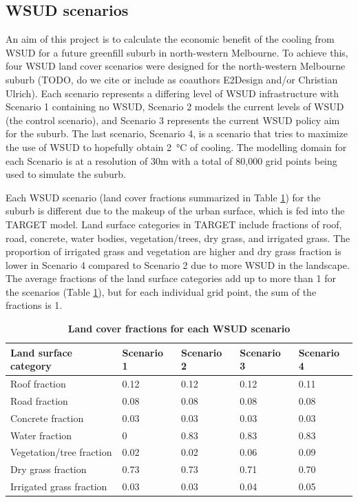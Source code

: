 \documentclass[final,3p,times,authoryear]{elsarticle}
\begin{document}
\subsection{WSUD scenarios}\label{sec:methods_wsudscenarios}
An aim of this project is to calculate the economic benefit of the cooling from WSUD for a future greenfill suburb in north-western Melbourne. To achieve this, four WSUD land cover scenarios were designed for the north-western Melbourne suburb (TODO, do we cite or include as coauthors E2Design and/or Christian Ulrich). Each scenario represents a differing level of WSUD infrastructure with Scenario 1 containing no WSUD, Scenario 2 models the current levels of WSUD (the control scenario), and Scenario 3 represents the current WSUD policy aim for the suburb. The last scenario, Scenario 4, is a scenario that tries to maximize the use of WSUD to hopefully obtain 2\SI{}{\degreeCelsius} of cooling. The modelling domain for each Scenario is at a resolution of 30m with a total of 80,000 grid points being used to simulate the suburb.

Each WSUD scenario (land cover fractions summarized in Table \ref{tab:parameters}) for the suburb is different due to the makeup of the urban surface, which is fed into the TARGET model. Land surface categories in TARGET include fractions of roof, road, concrete, water bodies, vegetation/trees, dry grass, and irrigated grass. The proportion of irrigated grass and vegetation are higher and dry grass fraction is lower in Scenario 4 compared to Scenario 2 due to more WSUD in the landscape. The average fractions of the land surface categories add up to more than 1 for the scenarios (Table \ref{tab:parameters}), but for each individual grid point, the sum of the fractions is 1.


\begin{table}[!htbp]
\caption{\bf Land cover fractions for each WSUD scenario  \label{tab:parameters}}     
\begin{tabular}{ l l l l l}
\textbf{Land surface category} & \textbf{Scenario 1} & \textbf{Scenario 2}  & \textbf{Scenario 3} & \textbf{Scenario 4}\\ \hline
Roof fraction & 0.12 & 0.12 & 0.12 & 0.11 \\ 
Road fraction & 0.08 & 0.08 & 0.08 & 0.08 \\ 
Concrete fraction & 0.03 & 0.03 & 0.03 & 0.03 \\ 
Water fraction & 0 & 0.83 & 0.83 & 0.83 \\ 
Vegetation/tree fraction & 0.02 & 0.02 & 0.06 & 0.09 \\ 
Dry grass fraction & 0.73 & 0.73 & 0.71 & 0.70 \\ 
Irrigated grass fraction & 0.03 & 0.03 & 0.04 & 0.05 \\ 
\hline
\end{tabular}
\end{table}
\end{document}
